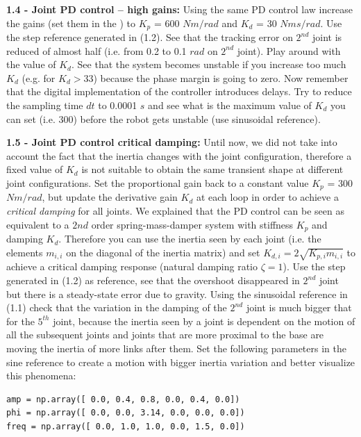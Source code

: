 \documentclass[11pt]{article}
\begin{document}
\quad

\noindent 
\textbf{1.4 - Joint PD control – high gains:}
Using the same PD control law increase the gains (set them in the ) to $K_p$ = 600 $Nm/rad$ and $K_d$ = 30 $Nms/rad$.  Use the step reference generated in (1.2). See that the tracking 
error on $2^{nd}$ joint is reduced of almost half (i.e. from 0.2 to 0.1 $rad$ on $2^{nd}$ joint). Play around with the value of $K_d$. See that the system becomes unstable if you 
increase too much $K_d$ (e.g. for $K_d>33$)  because the phase margin is going to zero. Now remember that the digital implementation of the controller introduces delays. Try to reduce the sampling time $dt$ to 0.0001 $s$ and see what is the maximum value of $K_d$ you can set (i.e. 300) before the robot gets unstable (use sinusoidal reference).

\quad

\noindent
\textbf{1.5 - Joint PD control critical damping:}
Until now, we did not take into account the fact that the inertia changes with the joint configuration, therefore a fixed value of $K_d$ is not suitable to obtain 
the same transient shape at different joint configurations. Set the proportional gain back to a constant value $K_p$ = 300 $Nm/rad$, but update the derivative gain 
$K_d$ at each loop in order to achieve a \textit{critical damping} for all  joints. We explained that the PD control can be seen as equivalent to a $2{nd}$ order 
spring-mass-damper system with stiffness $K_p$ and damping $K_d$. 
Therefore you can use the inertia seen by each joint (i.e. the elements $m_{i,i}$ on the diagonal 
of the inertia matrix) and set $K_{d,i} = 2\sqrt{K_{p,i} m_{i,i}}$ to achieve a critical damping response (natural damping ratio $\zeta = 1$). Use the step 
generated in (1.2) as reference, see that the overshoot disappeared in $2^{nd}$ joint but there is a steady-state error due to gravity. Using the sinusoidal 
reference in (1.1) %
check that the variation in the damping of the $2^{nd}$ joint is much bigger that for the $5^{th}$ joint, because the inertia seen by a joint  is dependent on the motion of all the subsequent joints and joints that are more proximal to the base are moving the inertia of more links after them.
Set the following parameters in the sine reference to create a motion with bigger inertia variation and better visualize this phenomena:


\begin{verbatim}
amp = np.array([ 0.0, 0.4, 0.8, 0.0, 0.4, 0.0])    
phi = np.array([ 0.0, 0.0, 3.14, 0.0, 0.0, 0.0])      
freq = np.array([ 0.0, 1.0, 1.0, 0.0, 1.5, 0.0])    
\end{verbatim}
\end{document}
